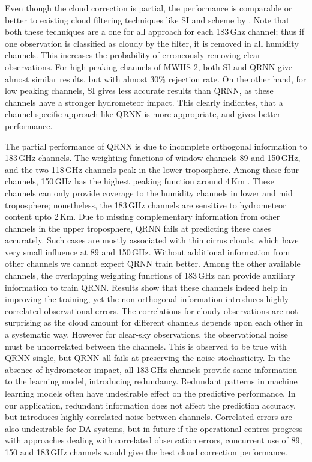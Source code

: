 \documentclass[amt, manuscript]{copernicus}
\begin{document}
Even though the cloud correction is partial, the performance is comparable or better to existing cloud filtering techniques like SI and scheme by \cite{buehler:aclou:07}. Note that both these techniques are a one for all approach for each 183\,Ghz channel; thus if one observation is classified as cloudy by the filter, it is removed in all humidity channels. This increases the probability of erroneously removing clear observations. For high peaking channels of MWHS-2, both SI and QRNN give almost similar results, but with almost 30\% rejection rate. On the other hand, for low peaking channels, SI gives less accurate results than QRNN, as these channels have a stronger hydrometeor impact. This clearly indicates, that a channel specific approach like QRNN is more appropriate, and gives better performance. 

The partial performance of QRNN is due to incomplete orthogonal information to 183\,GHz channels. The weighting functions of window channels 89 and 150\,GHz, and the two 118\,GHz channels peak in the lower troposphere. Among these four channels, 150\,GHz has the highest peaking function around 4\,Km \cite{chen2020mwhs}. These channels can only provide coverage to the humidity channels in lower and mid troposphere; nonetheless, the 183\,GHz channels are sensitive to hydrometeor content upto 2\,Km. Due to missing complementary information from other channels in the upper troposphere, QRNN fails at predicting these cases accurately. Such cases are mostly associated with thin cirrus clouds, which have very small influence at 89 and 150\,GHz. Without additional information from other channels we cannot expect QRNN train better. Among the other available channels, the overlapping weighting functions of 183\,GHz can provide auxiliary information to train QRNN. Results show that these channels indeed help in improving the training, yet the non-orthogonal information introduces highly correlated observational errors. The correlations for cloudy observations are not surprising as the cloud amount for different channels depends upon each other in a systematic way. However for clear-sky observations, the observational noise must be uncorrelated between the channels. This is observed to be true with QRNN-single, but QRNN-all fails at preserving the noise stochasticity. In the absence of hydrometeor impact, all 183\,GHz channels provide same information to the learning model, introducing redundancy. Redundant patterns in machine learning models often have undesirable effect on the predictive performance. In our application, redundant information does not affect the prediction accuracy, but introduces highly correlated noise between channels. Correlated errors are also undesirable for DA systems, but in future if the operational centres progress with approaches dealing with correlated observation errors, concurrent use of 89, 150 and 183\,GHz channels would give the best cloud correction performance.
\end{document}
